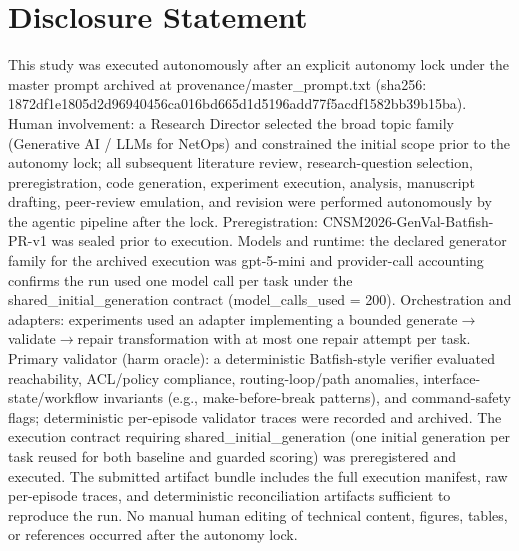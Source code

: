 \documentclass[conference]{IEEEtran}
\begin{document}
\section*{Disclosure Statement}
This study was executed autonomously after an explicit autonomy lock under the master prompt archived at provenance/master\_prompt.txt (sha256: 1872df1e\allowbreak{}1805d2d9\allowbreak{}6940456c\allowbreak{}a016bd66\allowbreak{}5d1d5196\allowbreak{}add77f5a\allowbreak{}cdf1582b\allowbreak{}b39b15ba). Human involvement: a Research Director selected the broad topic family (Generative AI / LLMs for NetOps) and constrained the initial scope prior to the autonomy lock; all subsequent literature review, research-question selection, preregistration, code generation, experiment execution, analysis, manuscript drafting, peer-review emulation, and revision were performed autonomously by the agentic pipeline after the lock. Preregistration: CNSM2026-GenVal-Batfish-PR-v1 was sealed prior to execution. Models and runtime: the declared generator family for the archived execution was gpt-5-mini and provider-call accounting confirms the run used one model call per task under the shared\_initial\_generation contract (model\_calls\_used = 200). Orchestration and adapters: experiments used an adapter implementing a bounded generate\ensuremath{\rightarrow}validate\ensuremath{\rightarrow}repair transformation with at most one repair attempt per task. Primary validator (harm oracle): a deterministic Batfish-style verifier evaluated reachability, ACL/policy compliance, routing-loop/path anomalies, interface-state/workflow invariants (e.g., make-before-break patterns), and command-safety flags; deterministic per-episode validator traces were recorded and archived. The execution contract requiring shared\_initial\_generation (one initial generation per task reused for both baseline and guarded scoring) was preregistered and executed. The submitted artifact bundle includes the full execution manifest, raw per-episode traces, and deterministic reconciliation artifacts sufficient to reproduce the run. No manual human editing of technical content, figures, tables, or references occurred after the autonomy lock.
\end{document}
